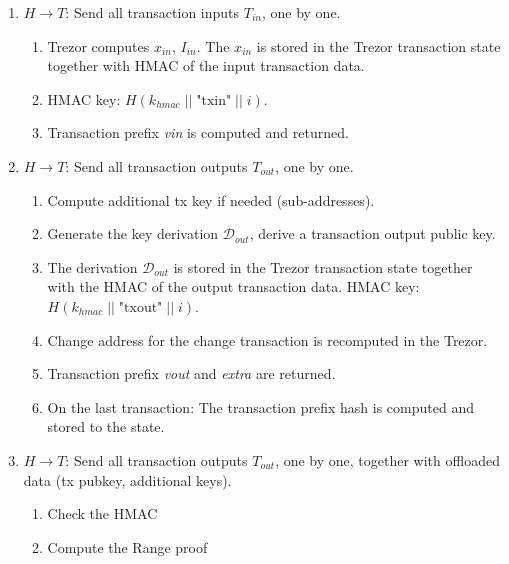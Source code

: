 \documentclass[]{article}
\begin{document}
\begin{enumerate}
	\item $H \rightarrow T$: Send all transaction inputs $T_{in}$, one by one.
	\begin{enumerate}
		\item Trezor computes $x_{in}$, $I_{in}$. The $x_{in}$ is stored in the Trezor transaction state together with HMAC of the input transaction data.
		
		\item HMAC key: $H(k_{hmac} \; || \; \text{"txin"} \; || \; i)$.
		
		\item Transaction prefix \emph{vin} is computed and returned.
	\end{enumerate} 
	
	\item $H \rightarrow T$: Send all transaction outputs $T_{out}$, one by one.
	\begin{enumerate}
		\item Compute additional tx key if needed (sub-addresses).
		
		\item Generate the key derivation $\mathcal{D}_{out}$, derive a transaction output public key.
		
        \item The derivation $\mathcal{D}_{out}$ is stored in the Trezor transaction state together with the HMAC of the output transaction data.
		HMAC key: $H(k_{hmac} \; || \; \text{"txout"} \; || \; i)$.
		
		\item Change address for the change transaction is recomputed in the Trezor.
		
		\item Transaction prefix \emph{vout} and \emph{extra} are returned. 
		
		\item On the last transaction: The transaction prefix hash is computed and stored to the state.
	\end{enumerate}
	  
	\item $H \rightarrow T$: Send all transaction outputs $T_{out}$, one by one, together with offloaded data (tx pubkey, additional keys). 
	\begin{enumerate}
		\item Check the HMAC
		
		\item Compute the Range proof 
		

\end{enumerate}
\end{enumerate}
\end{document}
